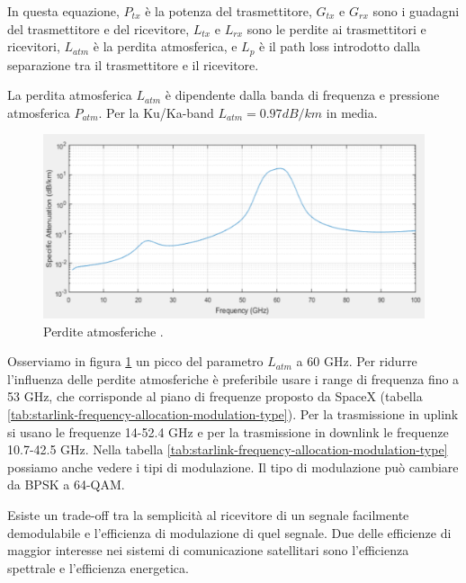 In questa equazione, $P_{tx}$ è la potenza del trasmettitore, $G_{tx}$ e $G_{rx}$ sono i guadagni del trasmettitore e del ricevitore, $L_{tx}$ e $L_{rx}$ sono le perdite ai trasmettitori e ricevitori, $L_{atm}$ è la perdita atmosferica, e $L_{p}$ è il path loss introdotto dalla separazione tra il trasmettitore e il ricevitore.

La perdita atmosferica $L_{atm}$ è dipendente dalla banda di frequenza e pressione atmosferica $P_{atm}$.
Per la Ku/Ka-band $L_{atm} = 0.97 dB/km$ in media.

\begin{figure}[htbp]
  \centering
  \includegraphics[width=0.8\linewidth]{./res/img/atmospheric_losses_simulation.png}
  \caption{Perdite atmosferiche \cite{rozenvasser_estimation_2023}.}
  \label{fig:atmospheric-losses-simulation}
\end{figure}

Osserviamo in figura \ref{fig:atmospheric-losses-simulation} un picco del parametro $L_{atm}$ a 60 GHz.
Per ridurre l'influenza delle perdite atmosferiche è preferibile usare i range di frequenza fino a 53 GHz, che corrisponde al piano di frequenze proposto da SpaceX (tabella \ref{tab:starlink-frequency-allocation-modulation-type}).
Per la trasmissione in uplink si usano le frequenze 14-52.4 GHz e per la trasmissione in downlink le frequenze 10.7-42.5 GHz.
Nella tabella \ref{tab:starlink-frequency-allocation-modulation-type} possiamo anche vedere i tipi di modulazione.
Il tipo di modulazione può cambiare da \ac{BPSK} a 64-\ac{QAM}.

Esiste un trade-off tra la semplicità al ricevitore di un segnale facilmente demodulabile e l'efficienza di modulazione di quel segnale.
Due delle efficienze di maggior interesse nei sistemi di comunicazione satellitari sono l'efficienza spettrale e l'efficienza energetica.

